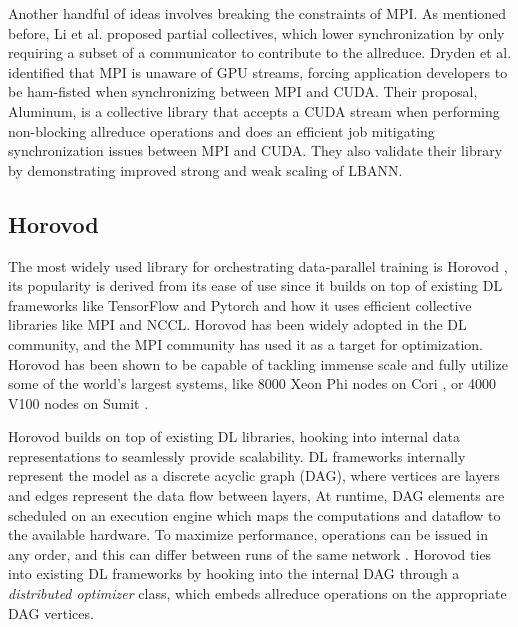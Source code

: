 Another handful of ideas involves breaking the constraints of MPI.
As mentioned before, Li et al. \cite{Li2020DLPartialColl} proposed partial collectives, which lower synchronization by only requiring a subset of a communicator to contribute to the allreduce. 
Dryden et al. \cite{Dryden2018Aluminum} identified that MPI is unaware of GPU streams, forcing application developers to be ham-fisted when synchronizing between MPI and CUDA.
Their proposal, Aluminum, is a collective library that accepts a CUDA stream when performing non-blocking allreduce operations and does an efficient job mitigating synchronization issues between MPI and CUDA.
They also validate their library by demonstrating improved strong and weak scaling of LBANN.

\subsection{Horovod}\label{sec:CH3-horovod}
The most widely used library for orchestrating data-parallel training is Horovod \cite{Sergeev2018Horovod}, its popularity is derived from its ease of use since it builds on top of existing DL frameworks like TensorFlow and Pytorch and how it uses efficient collective libraries like MPI and NCCL.
Horovod has been widely adopted in the DL community, and the MPI community has used it as a target for optimization.
Horovod has been shown to be capable of tackling immense scale and fully utilize some of the world's largest systems, like 8000 Xeon Phi nodes on Cori \cite{Mathuriya2019Cosmoflow}, or 4000 V100 nodes on Sumit \cite{Kurth2018ExascaleDLClimate}.

Horovod builds on top of existing DL libraries, hooking into internal data representations to seamlessly provide scalability.
DL frameworks internally represent the model as a discrete acyclic graph (DAG), where vertices are layers and edges represent the data flow between layers, 
At runtime, DAG elements are scheduled on an execution engine which maps the computations and dataflow to the available hardware.
To maximize performance, operations can be issued in any order, and this can differ between runs of the same network \cite{Abadi2015TensorflowWhitepaper}. 
Horovod ties into existing DL frameworks by hooking into the internal DAG through a \textit{distributed optimizer} class, which embeds allreduce operations on the appropriate DAG vertices.

